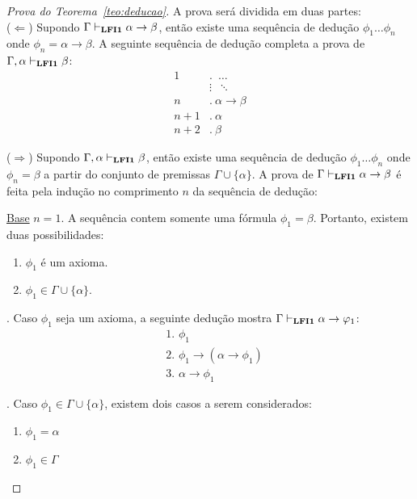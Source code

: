     \begin{proof}[Prova do Teorema~\ref{teo:deducao}] A prova será dividida em duas partes:\\
        ($\Longleftarrow$) Supondo $\Gamma \vdash_{\textbf{LFI1}{}} \alpha \to \beta$, então existe uma sequência de dedução $\phi_{1} \ldots \phi_{n}$ onde $\phi_{n} = \alpha \to \beta$. A seguinte sequência de dedução completa a prova de $\Gamma, \alpha \vdash_{\textbf{LFI1}{}} \beta$:
        \begin{align*}
            \text{1}&.~ \; \ldots\\
            & \vdots \; ~\ddots\\
            \text{$n$}&.~ \alpha \to \beta\tag{Suposição}\\
            \text{$n + 1$}&.~ \alpha\tag{Premissa}\\
            \text{$n + 2$}&.~ \beta\tag{MP $n, n + 1$}
        \end{align*}

        \noindent  ($\Longrightarrow$) Supondo $\Gamma, \alpha \vdash_{\textbf{LFI1}{}} \beta$, então existe uma sequência de dedução $\phi_{1} \ldots \phi_{n}$ onde $\phi_{n} = \beta$ a partir do conjunto de premissas $\Gamma \cup \{\alpha\}$. A prova de $\Gamma \vdash_{\textbf{LFI1}{}} \alpha \to \beta$ é feita pela indução no comprimento $n$ da sequência de dedução:

        \noindent\underline{Base} $n = 1$.
        A sequência contem somente uma fórmula $\phi_{1} = \beta$. Portanto, existem duas possibilidades:
        \begin{enumerate}
            \item $\phi_{1}$ é um axioma.
            \item $\phi_{1} \in \Gamma \cup \{\alpha\}$.
        \end{enumerate}

        . Caso $\phi_{1}$ seja um axioma, a seguinte dedução mostra $\Gamma \vdash_{\textbf{LFI1}{}} \alpha \to \varphi_{1}$:
        \begin{align*}
            & \text{1. } \phi_{1} \tag{Axioma}\\
            & \text{2. } \phi_{1} \to (\alpha \to \phi_{1}) \tag{Ax1}\\
            & \text{3. } \alpha \to \phi_{1} \tag{MP 1,2}
        \end{align*}
        
        . Caso $\phi_{1} \in \Gamma \cup \{\alpha\}$, existem dois casos a serem considerados:
        \begin{enumerate}
            \item $\phi_{1} = \alpha$
            \item $\phi_{1} \in \Gamma$
        \end{enumerate}


\end{proof}
